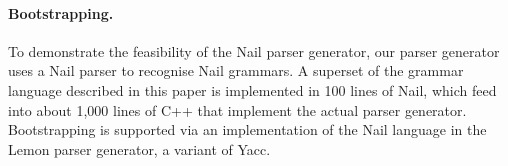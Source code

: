 \paragraph{Bootstrapping.}

To demonstrate the feasibility of the Nail parser generator, our parser
generator uses a Nail parser to recognise Nail grammars. A superset of the
grammar language described in this paper is implemented in 100 lines of Nail,
which feed into about 1,000 lines of C++ that implement the actual parser
generator. Bootstrapping is supported via an implementation of the Nail language
in the Lemon parser generator, a variant of Yacc.
